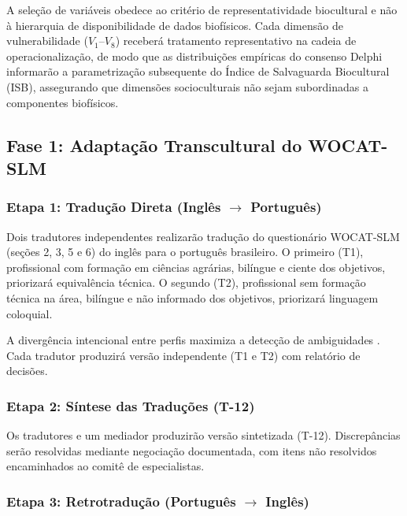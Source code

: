 A seleção de variáveis obedece ao critério de representatividade biocultural e não à hierarquia de disponibilidade de dados biofísicos. Cada dimensão de vulnerabilidade ($V_1$--$V_8$) receberá tratamento representativo na cadeia de operacionalização, de modo que as distribuições empíricas do consenso Delphi informarão a parametrização subsequente do Índice de Salvaguarda Biocultural (ISB), assegurando que dimensões socioculturais não sejam subordinadas a componentes biofísicos.

\subsection{Fase 1: Adaptação Transcultural do WOCAT-SLM}

\subsubsection{Etapa 1: Tradução Direta (Inglês $\rightarrow$ Português)}

Dois tradutores independentes realizarão tradução do questionário WOCAT-SLM (seções 2, 3, 5 e 6) do inglês para o português brasileiro. O primeiro (T1), profissional com formação em ciências agrárias, bilíngue e ciente dos objetivos, priorizará equivalência técnica. O segundo (T2), profissional sem formação técnica na área, bilíngue e não informado dos objetivos, priorizará linguagem coloquial.

A divergência intencional entre perfis maximiza a detecção de ambiguidades \cite{Beaton2000}. Cada tradutor produzirá versão independente (T1 e T2) com relatório de decisões.

\subsubsection{Etapa 2: Síntese das Traduções (T-12)}

Os tradutores e um mediador produzirão versão sintetizada (T-12). Discrepâncias serão resolvidas mediante negociação documentada, com itens não resolvidos encaminhados ao comitê de especialistas.

\subsubsection{Etapa 3: Retrotradução (Português $\rightarrow$ Inglês)}

